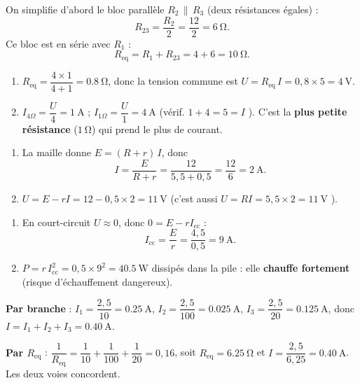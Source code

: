 \documentclass[11pt,a4paper]{article}
\begin{document}
\usetikzlibrary{babel}
\begin{corrige}
On simplifie d'abord le bloc parallèle $R_2\,\|\,R_3$ (deux résistances égales) :
\[ R_{23}=\frac{R_2}{2}=\frac{12}{2}=\qty{6}{\ohm}. \]
Ce bloc est en série avec $R_1$ :
\[ R_{\text{eq}}=R_1+R_{23}=4+6=\qty{10}{\ohm}. \]
\end{corrige}

\begin{corrige}
\begin{enumerate}[label=\alph*)]
  \item $R_{\text{eq}}=\dfrac{4\times1}{4+1}=\qty{0.8}{\ohm}$, donc la tension commune est
        $U=R_{\text{eq}}\,I=0{,}8\times5=\qty{4}{\volt}$.
  \item $I_{4\Omega}=\dfrac{U}{4}=\qty{1}{\ampere}$ ; \; $I_{1\Omega}=\dfrac{U}{1}=\qty{4}{\ampere}$
        (vérif. $1+4=5=I$ \checkmark). C'est la \textbf{plus petite résistance} ($\qty{1}{\ohm}$) qui
        prend le plus de courant.
\end{enumerate}
\end{corrige}

\begin{corrige}
\begin{enumerate}[label=\alph*)]
  \item La maille donne $E=(R+r)\,I$, donc
        \[ I=\frac{E}{R+r}=\frac{12}{5{,}5+0{,}5}=\frac{12}{6}=\qty{2}{\ampere}. \]
  \item $U=E-rI=12-0{,}5\times2=\qty{11}{\volt}$ (c'est aussi $U=RI=5{,}5\times2=\qty{11}{\volt}$ \checkmark).
\end{enumerate}
\end{corrige}

\begin{corrige}
\begin{enumerate}[label=\alph*)]
  \item En court-circuit $U\approx0$, donc $0=E-rI_{\text{cc}}$ :
        \[ I_{\text{cc}}=\frac{E}{r}=\frac{4{,}5}{0{,}5}=\qty{9}{\ampere}. \]
  \item $P=r\,I_{\text{cc}}^{2}=0{,}5\times9^{2}=\qty{40.5}{\watt}$ dissipés dans la pile : elle
        \textbf{chauffe fortement} (risque d'échauffement dangereux).
\end{enumerate}
\end{corrige}

\begin{corrige}
\textbf{Par branche} : $I_1=\dfrac{2{,}5}{10}=\qty{0.25}{\ampere}$,
$I_2=\dfrac{2{,}5}{100}=\qty{0.025}{\ampere}$, $I_3=\dfrac{2{,}5}{20}=\qty{0.125}{\ampere}$, donc
$I=I_1+I_2+I_3=\qty{0.40}{\ampere}$.

\textbf{Par $R_{\text{eq}}$} : $\dfrac{1}{R_{\text{eq}}}=\dfrac{1}{10}+\dfrac{1}{100}+\dfrac{1}{20}=0{,}16$,
soit $R_{\text{eq}}=\qty{6.25}{\ohm}$ et $I=\dfrac{2{,}5}{6{,}25}=\qty{0.40}{\ampere}$. Les deux voies
concordent.
\end{corrige}
\end{document}

